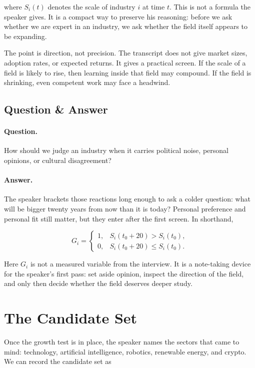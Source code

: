 where \(S_i(t)\) denotes the scale of industry \(i\) at time \(t\). This is not a formula the speaker gives. It is a compact way to preserve his reasoning: before we ask whether we are expert in an industry, we ask whether the field itself appears to be expanding.

The point is direction, not precision. The transcript does not give market sizes, adoption rates, or expected returns. It gives a practical screen. If the scale of a field is likely to rise, then learning inside that field may compound. If the field is shrinking, even competent work may face a headwind.

\subsection{Question \& Answer}

\paragraph{Question.}
How should we judge an industry when it carries political noise, personal opinions, or cultural disagreement?

\paragraph{Answer.}
The speaker brackets those reactions long enough to ask a colder question: what will be bigger twenty years from now than it is today? Personal preference and personal fit still matter, but they enter after the first screen. In shorthand,

\begin{equation}
G_i =
\begin{cases}
1, & S_i(t_0+20) > S_i(t_0),\\
0, & S_i(t_0+20) \leq S_i(t_0).
\end{cases}
\end{equation}

Here \(G_i\) is not a measured variable from the interview. It is a note-taking device for the speaker's first pass: set aside opinion, inspect the direction of the field, and only then decide whether the field deserves deeper study.

\section{The Candidate Set}

Once the growth test is in place, the speaker names the sectors that came to mind: technology, artificial intelligence, robotics, renewable energy, and crypto. We can record the candidate set as

